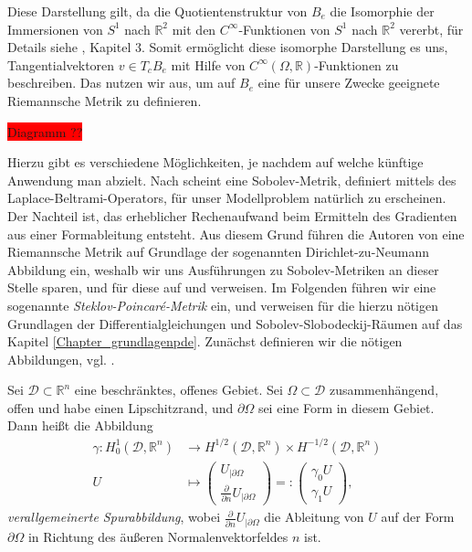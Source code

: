 Diese Darstellung gilt, da die Quotientenstruktur von $B_e$ die Isomorphie der Immersionen von $S^1$ nach $\mathbb{R}^2$ mit den $C^\infty$-Funktionen von $S^1$ nach $\mathbb{R}^2$ vererbt, für Details siehe \cite{shape_space}, Kapitel 3.
Somit ermöglicht diese isomorphe Darstellung es uns, Tangentialvektoren $v \in T_cB_e$ mit Hilfe von $C^\infty(\Omega, \mathbb{R})$-Funktionen zu beschreiben. Das nutzen wir aus, um auf $B_e$ eine für unsere Zwecke geeignete Riemannsche Metrik zu definieren.

\colorbox{red}{Diagramm ??}

Hierzu gibt es verschiedene Möglichkeiten, je nachdem auf welche künftige Anwendung man abzielt. Nach \cite{shape_space} scheint eine Sobolev-Metrik, definiert mittels des Laplace-Beltrami-Operators, für unser Modellproblem natürlich zu erscheinen. Der Nachteil ist, das erheblicher Rechenaufwand beim Ermitteln des Gradienten aus einer Formableitung entsteht. Aus diesem Grund führen die Autoren von \cite{bfgs1} eine Riemannsche Metrik auf Grundlage der sogenannten Dirichlet-zu-Neumann Abbildung ein, weshalb wir uns Ausführungen zu Sobolev-Metriken an dieser Stelle sparen, und für diese auf \cite{bfgs1} und \cite{shape_space}  verweisen. Im Folgenden führen wir eine sogenannte \textit{Steklov-Poincaré-Metrik} ein, und verweisen für die hierzu nötigen Grundlagen der Differentialgleichungen und Sobolev-Slobodeckij-Räumen auf das Kapitel \ref{Chapter_grundlagenpde}. Zunächst definieren wir die nötigen Abbildungen, vgl. \cite{bfgs2}.

\begin{defi}\label{Sproperatoren}
Sei $\mathcal{D} \subset \mathbb{R}^n$ eine beschränktes, offenes Gebiet. Sei $\Omega \subset \mathcal{D}$ zusammenhängend, offen und habe einen Lipschitzrand, und $\partial \Omega$ sei eine Form in diesem Gebiet. Dann heißt die Abbildung
\begin{align*}
	\gamma: H^{1}_0(\mathcal{D}, \mathbb{R}^n) &\rightarrow H^{1/2}(\mathcal{D}, \mathbb{R}^n)\times H^{-1/2}(\mathcal{D}, \mathbb{R}^n) \\
	U &\mapsto 
	\left(\begin{matrix}
	U_{\vert \partial\Omega} \\ \frac{\partial}{\partial n} U_{\vert \partial\Omega}
	\end{matrix}\right)
	=:
	\left(\begin{matrix}
	\gamma_0 U \\ \gamma_1 U
	\end{matrix}\right)	 ,
\end{align*}
\textit{verallgemeinerte Spurabbildung}, wobei $\frac{\partial}{\partial n} U_{\vert\partial\Omega}$ die Ableitung von $U$ auf der Form $\partial \Omega$ in Richtung des äußeren Normalenvektorfeldes $n$ ist.
\end{defi}

